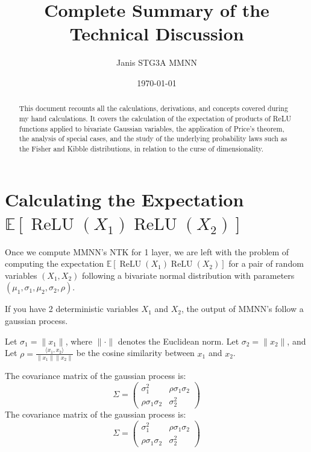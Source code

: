 \documentclass[11pt, a4paper]{article}
\title{Complete Summary of the Technical Discussion}
\author{Janis STG3A MMNN}
\date{\today}
\newcommand{\E}{\mathbb{E}}
\DeclareMathOperator{\ReLU}{ReLU}
\begin{document}
\maketitle

\begin{abstract}
This document recounts all the calculations, derivations, and concepts covered during my hand calculations. It covers the calculation of the expectation of products of ReLU functions applied to bivariate Gaussian variables, the application of Price's theorem, the analysis of special cases, and the study of the underlying probability laws such as the Fisher and Kibble distributions, in relation to the curse of dimensionality.
\end{abstract}

\newpage
\section{Calculating the Expectation $\E[\ReLU(X_1)\ReLU(X_2)]$}
Once we compute MMNN's NTK for 1 layer, we are left with the problem of computing the expectation $\E[\ReLU(X_1)\ReLU(X_2)]$ for a pair of random variables $(X_1, X_2)$ following a bivariate normal distribution with parameters $(\mu_1, \sigma_1, \mu_2, \sigma_2, \rho)$.

If you have 2 deterministic variables $X_1$ and $X_2$, the output of MMNN's follow a gaussian process.

Let $\sigma_1 = \|x_1\|$, where $\|\cdot\|$ denotes the Euclidean norm.
Let $\sigma_2 = \|x_2\|$, and
Let $\rho = \frac{\langle x_1, x_2 \rangle}{\|x_1\| \|x_2\|}$ be the cosine similarity between $x_1$ and $x_2$.

The covariance matrix of the gaussian process is:
\[
\Sigma = \begin{pmatrix}
\sigma_1^2 & \rho\sigma_1\sigma_2 \\
\rho\sigma_1\sigma_2 & \sigma_2^2
\end{pmatrix}
\]
The covariance matrix of the gaussian process is:
\[
\Sigma = \begin{pmatrix}
\sigma_1^2 & \rho\sigma_1\sigma_2 \\
\rho\sigma_1\sigma_2 & \sigma_2^2
\end{pmatrix}
\]
\end{document}
